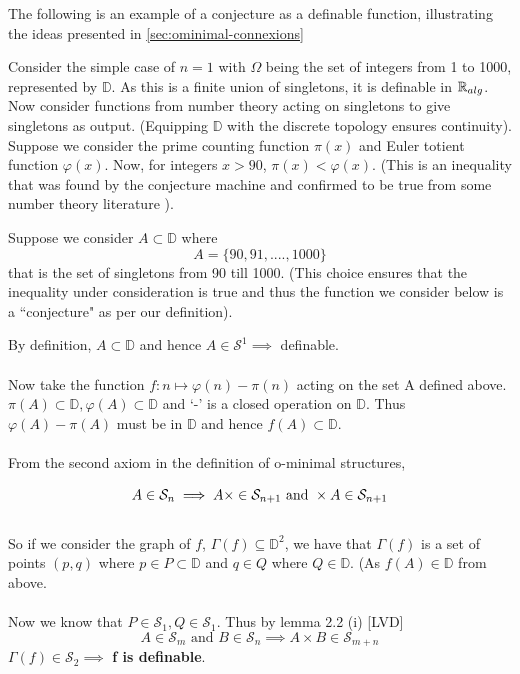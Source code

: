 The following is an example of a conjecture as a definable function, illustrating the ideas presented in \ref{sec:ominimal-connexions}
\begin{exmp}
    Consider the simple case of $n=1$ with $\Omega$ being the set of integers from 1 to 1000, represented by $\mathbb{D}$.
    As this is a finite union of singletons, it is definable in $\mathbb{R}_{alg}$. Now consider functions from number theory acting on singletons to give singletons as output. (Equipping $\mathbb{D}$ with the discrete topology ensures continuity). Suppose we consider the prime counting function $\pi(x)$ and Euler totient function $\varphi(x)$. Now, for integers $x > 90$, $\pi(x) < \varphi(x)$. (This is an inequality that was found by the conjecture machine and confirmed to be true from some number theory literature \cite{moser1951}).

    Suppose we consider $A\subset\mathbb{D}$ where
    \begin{equation*}
        A = \{90, 91,....,1000\}
    \end{equation*}
    that is the set of singletons from 90 till 1000. (This choice ensures that the inequality under consideration is true and thus the function we consider below is a ``conjecture" as per our definition).

    By definition, $A\subset\mathbb{D}$ and hence $A\in\mathcal{S}^1 \implies $ definable.
    \\\\
    Now take the function $f: n\mapsto\varphi(n) - \pi(n)$ acting on the set A defined above. $\pi(A)\subset\mathbb{D}, \varphi(A)\subset\mathbb{D}$ and `-' is a closed operation on $\mathbb{D}$. Thus $\varphi(A) - \pi(A)$ must be in $\mathbb{D}$ and hence $f(A)\subset\mathbb{D}$.
    \\\\
    From the second axiom in the definition of o-minimal structures,

    \begin{equation*}
        A \in \mathcal{S}_n\implies A \times\real\in\mathcal{S}_{n+1} \text{ and } \real \times A\in\mathcal{S}_{n+1}
    \end{equation*}
    \\
    So if we consider the graph of $f$, $\Gamma(f)\subseteq\mathbb{D}^2$, we have that $\Gamma(f)$ is a set of points $(p,q)$ where $p\in P\subset\mathbb{D}$ and $q\in Q$ where $Q\in\mathbb{D}$. (As $f(A)\in\mathbb{D}$ from above.
    \\\\
    Now we know that $P\in\mathcal{S}_1, Q\in\mathcal{S}_1$. Thus by lemma 2.2 (i) [LVD]
    \begin{equation*}
        A\in\mathcal{S}_m \text{ and } B\in\mathcal{S}_n \implies A\times B\in\mathcal{S}_{m+n}
    \end{equation*}
    $\Gamma(f)\in\mathcal{S}_2\implies$ \textbf{f is definable}.


\end{exmp}
